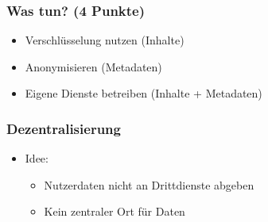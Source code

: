 \documentclass[12pt]{beamer}
\begin{document}
\begin{frame}
  \frametitle{Was tun? (4 Punkte)}
  \begin{itemize}
    \item Verschlüsselung nutzen (Inhalte)
    \item Anonymisieren (Metadaten)
    \item Eigene Dienste betreiben (Inhalte + Metadaten)
  \end{itemize}
\end{frame}

\begin{frame}
  \frametitle{Dezentralisierung}
  \begin{itemize}
    \item Idee:
    \begin{itemize}
      \item<1-> Nutzerdaten nicht an Drittdienste abgeben
      \item<2-> Kein zentraler Ort für Daten
    \end{itemize}
  \end{itemize}
\end{frame}
\end{document}
